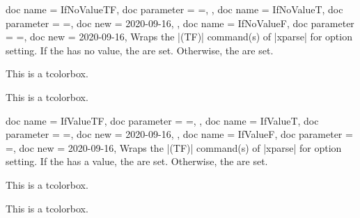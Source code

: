 \begin{docTcbKeys}[doc description = {no default}]
  {
    {
      doc name        = IfNoValueTF,
      doc parameter   = {=},
    },
    {
      doc name        = IfNoValueT,
      doc parameter   = {=},
      doc new         = 2020-09-16,
    },
    {
      doc name        = IfNoValueF,
      doc parameter   = {=},
      doc new         = 2020-09-16,
    }
  }
  Wraps the |\IfNoValue(TF)| command(s) of |xparse| for option setting.
  If the  has no value, the  are set.
  Otherwise, the  are set.
\begin{dispExample}

\begin{mybox}
This is a tcolorbox.
\end{mybox}

\begin{mybox}
This is a tcolorbox.
\end{mybox}
\end{dispExample}
\end{docTcbKeys}

\clearpage


\begin{docTcbKeys}[doc description = {no default}]
  {
    {
      doc name        = IfValueTF,
      doc parameter   = {=},
    },
    {
      doc name        = IfValueT,
      doc parameter   = {=},
      doc new         = 2020-09-16,
    },
    {
      doc name        = IfValueF,
      doc parameter   = {=},
      doc new         = 2020-09-16,
    }
  }
  Wraps the |\IfValue(TF)| command(s) of |xparse| for option setting.
  If the  has a value, the  are set.
  Otherwise, the  are set.
\begin{dispExample}

\begin{mybox}
This is a tcolorbox.
\end{mybox}

\begin{mybox}[My title]
This is a tcolorbox.
\end{mybox}
\end{dispExample}
\end{docTcbKeys}

